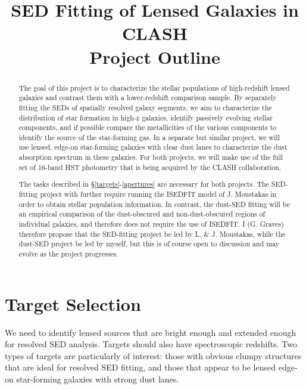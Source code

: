 \documentclass[preprint,12pt]{aastex}
\begin{document}
\title{SED Fitting of Lensed Galaxies in CLASH \\ Project Outline}

\def\abstractname{}%
\begin{abstract}

The goal of this project is to characterize the stellar populations of
high-redshift lensed galaxies and contrast them with a lower-redshift
comparison sample.  By separately fitting the SEDs of spatially
resolved galaxy segments, we aim to characterize the distribution of
star formation in high-z galaxies, identify passively evolving stellar
components, and if possible compare the metallicities of the various
components to identify the source of the star-forming gas.  In a
separate but similar project, we will use lensed, edge-on star-forming
galaxies with clear dust lanes to characterize the dust absorption
spectrum in these galaxies.  For both projects, we will make use of
the full set of 16-band HST photometry that is being acquired by the
CLASH collaboration.

The tasks described in \S\ref{targets}-\ref{apertures} are necessary
for both projects.  The SED-fitting project with further require
running the ISEDFIT model of J. Moustakas in order to obtain stellar
population information.  In contrast, the dust-SED fitting will be an
empirical comparison of the dust-obscured and non-dust-obscured
regions of individual galaxies, and therefore does not require the use
of ISEDFIT.  I (G. Graves) therefore propose that the SED-fitting
project be led by L. \& J. Moustakas, while the dust-SED project be
led by myself, but this is of course open to discussion and may evolve
as the project progresses.

\end{abstract}


\section{Target Selection}\label{targets}

We need to identify lensed sources that are bright enough and extended
enough for resolved SED analysis.  Targets should also have
spectroscopic redshifts.  Two types of targets are particularly of
interest: those with obvious clumpy structures that are ideal for
resolved SED fitting, and those that appear to be lensed edge-on
star-forming galaxies with strong dust lanes.
\end{document}
